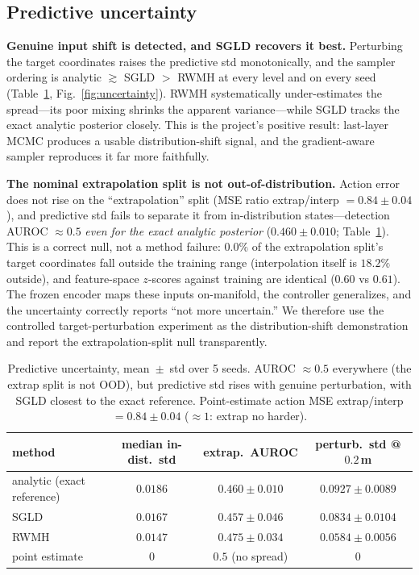 \documentclass[11pt]{article}
\begin{document}
\subsection{Predictive uncertainty}\label{sec:uncertainty}
\textbf{Genuine input shift is detected, and SGLD recovers it best.} Perturbing the target coordinates
raises the predictive std monotonically, and the sampler ordering is analytic $\gtrsim$ SGLD $>$ RWMH at
every level and on every seed (Table~\ref{tab:uncertainty}, Fig.~\ref{fig:uncertainty}). RWMH
systematically under-estimates the spread---its poor mixing shrinks the apparent variance---while SGLD
tracks the exact analytic posterior closely. This is the project's positive result: last-layer MCMC
produces a usable distribution-shift signal, and the gradient-aware sampler reproduces it far more
faithfully.

\textbf{The nominal extrapolation split is not out-of-distribution.} Action error does not rise on the
``extrapolation'' split (MSE ratio extrap/interp $=0.84\pm0.04$), and predictive std fails to separate it
from in-distribution states---detection AUROC $\approx0.5$ \emph{even for the exact analytic posterior}
($0.460\pm0.010$; Table~\ref{tab:uncertainty}). This is a correct null, not a method failure: $0.0\%$ of
the extrapolation split's target coordinates fall outside the training range (interpolation itself is
$18.2\%$ outside), and feature-space $z$-scores against training are identical ($0.60$ vs $0.61$). The
frozen encoder maps these inputs on-manifold, the controller generalizes, and the uncertainty correctly
reports ``not more uncertain.'' We therefore use the controlled target-perturbation experiment as the
distribution-shift demonstration and report the extrapolation-split null transparently.

\begin{table}[h]
\centering\small
\begin{tabular}{@{}lccc@{}}
\toprule
method & median in-dist.\ std & extrap.\ AUROC & perturb.\ std @ $0.2$\,m \\
\midrule
analytic (exact reference) & $0.0186$ & $0.460\pm0.010$ & $0.0927\pm0.0089$ \\
SGLD & $0.0167$ & $0.457\pm0.046$ & $0.0834\pm0.0104$ \\
RWMH & $0.0147$ & $0.475\pm0.034$ & $0.0584\pm0.0056$ \\
point estimate & $0$ & $0.5$ (no spread) & $0$ \\
\bottomrule
\end{tabular}
\caption{Predictive uncertainty, mean~$\pm$~std over 5 seeds. AUROC $\approx0.5$ everywhere (the extrap
split is not OOD), but predictive std rises with genuine perturbation, with SGLD closest to the exact
reference. Point-estimate action MSE extrap/interp $=0.84\pm0.04$ ($\approx1$: extrap no harder).}
\label{tab:uncertainty}
\end{table}
\end{document}
